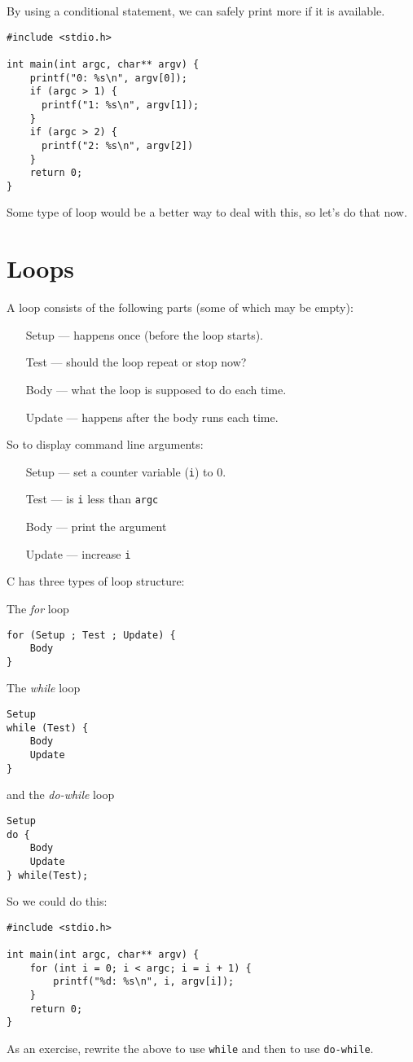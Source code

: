 By using a conditional statement, we can safely print more if it is available.
\begin{lstlisting}
#include <stdio.h>

int main(int argc, char** argv) {
    printf("0: %s\n", argv[0]);
    if (argc > 1) {
      printf("1: %s\n", argv[1]);    
    }
    if (argc > 2) {
      printf("2: %s\n", argv[2])
    }
    return 0;
}
\end{lstlisting}
Some type of loop would be a better way to deal with this, so let's do that now.

\section{Loops}
A loop consists of the following parts (some of which may be empty):
\begin{itemize}
 \item [Setup] --- happens once (before the loop starts).
 \item [Test]  --- should the loop repeat or stop now?
 \item [Body]  --- what the loop is supposed to do each time.
 \item [Update] --- happens after the body runs each time.
\end{itemize}

So to display command line arguments:
\begin{itemize}
 \item [Setup] --- set a counter variable (\texttt{i}) to 0.
 \item [Test]  --- is \texttt{i} less than \texttt{argc}
 \item [Body]  --- print the argument
 \item [Update] --- increase \texttt{i}
\end{itemize}

C has three types of loop structure:

The \emph{for} loop
\begin{lstlisting}
for (Setup ; Test ; Update) {
    Body
}
\end{lstlisting}

The \emph{while} loop
\begin{lstlisting}
Setup
while (Test) {
    Body
    Update
}
\end{lstlisting}

and the \emph{do-while} loop
\begin{lstlisting}
Setup
do {
    Body
    Update
} while(Test);
\end{lstlisting}

So we could do this:
\begin{lstlisting}
#include <stdio.h>

int main(int argc, char** argv) {
    for (int i = 0; i < argc; i = i + 1) {
        printf("%d: %s\n", i, argv[i]);
    }
    return 0;
}
\end{lstlisting}

As an exercise, rewrite the above to use \texttt{while} and then to use \texttt{do-while}.
